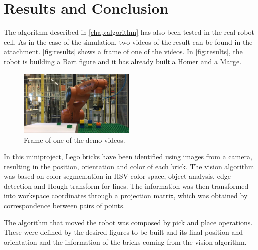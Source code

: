 \chapter{Results and Conclusion}\label{chap:results}
The algorithm described in \autoref{chap:algorithm} has also been tested in the real robot cell. As in the case of the simulation, two videos of the result can be found in the attachment. \autoref{fig:results} shows a frame of one of the videos. In \autoref{fig:results}, the robot is building a Bart figure and it has already built a Homer and a Marge.

\begin{figure}[H]
	\includegraphics[width=0.5\textwidth]{figures/results.png}
    \caption{Frame of one of the demo videos.}
    \label{fig:results}    
\end{figure}

In this miniproject, Lego bricks have been identified using images from a camera, resulting in the position, orientation and color of each brick. The vision algorithm was based on color segmentation in HSV color space, object analysis, edge detection and Hough transform for lines. The information was then transformed into workspace coordinates through a projection matrix, which was obtained by correspondence between pairs of points.

The algorithm that moved the robot was composed by pick and place operations. These were defined by the desired figures to be built and its final position and orientation and the information of the bricks coming from the vision algorithm.